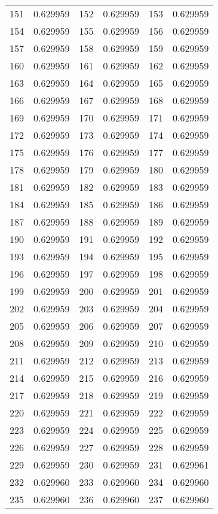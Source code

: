 \documentclass[12pt]{article}
\begin{document}
\begin{longtable}{@{}cc|cc|cc@{}}
151 & 0.629959 & 152 & 0.629959 & 153 & 0.629959 \\
154 & 0.629959 & 155 & 0.629959 & 156 & 0.629959 \\
157 & 0.629959 & 158 & 0.629959 & 159 & 0.629959 \\
160 & 0.629959 & 161 & 0.629959 & 162 & 0.629959 \\
163 & 0.629959 & 164 & 0.629959 & 165 & 0.629959 \\
166 & 0.629959 & 167 & 0.629959 & 168 & 0.629959 \\
169 & 0.629959 & 170 & 0.629959 & 171 & 0.629959 \\
172 & 0.629959 & 173 & 0.629959 & 174 & 0.629959 \\
175 & 0.629959 & 176 & 0.629959 & 177 & 0.629959 \\
178 & 0.629959 & 179 & 0.629959 & 180 & 0.629959 \\
181 & 0.629959 & 182 & 0.629959 & 183 & 0.629959 \\
184 & 0.629959 & 185 & 0.629959 & 186 & 0.629959 \\
187 & 0.629959 & 188 & 0.629959 & 189 & 0.629959 \\
190 & 0.629959 & 191 & 0.629959 & 192 & 0.629959 \\
193 & 0.629959 & 194 & 0.629959 & 195 & 0.629959 \\
196 & 0.629959 & 197 & 0.629959 & 198 & 0.629959 \\
199 & 0.629959 & 200 & 0.629959 & 201 & 0.629959 \\
202 & 0.629959 & 203 & 0.629959 & 204 & 0.629959 \\
205 & 0.629959 & 206 & 0.629959 & 207 & 0.629959 \\
208 & 0.629959 & 209 & 0.629959 & 210 & 0.629959 \\
211 & 0.629959 & 212 & 0.629959 & 213 & 0.629959 \\
214 & 0.629959 & 215 & 0.629959 & 216 & 0.629959 \\
217 & 0.629959 & 218 & 0.629959 & 219 & 0.629959 \\
220 & 0.629959 & 221 & 0.629959 & 222 & 0.629959 \\
223 & 0.629959 & 224 & 0.629959 & 225 & 0.629959 \\
226 & 0.629959 & 227 & 0.629959 & 228 & 0.629959 \\
229 & 0.629959 & 230 & 0.629959 & 231 & 0.629961 \\
232 & 0.629960 & 233 & 0.629960 & 234 & 0.629960 \\
235 & 0.629960 & 236 & 0.629960 & 237 & 0.629960 \\

\end{longtable}
\end{document}
